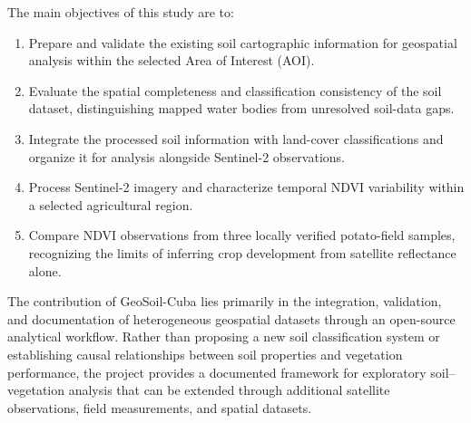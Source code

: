 The main objectives of this study are to:

\begin{enumerate}
	
	\item Prepare and validate the existing soil cartographic
	information for geospatial analysis within the selected
	Area of Interest (AOI).
	
	\item Evaluate the spatial completeness and classification
	consistency of the soil dataset, distinguishing mapped
	water bodies from unresolved soil-data gaps.
	
	\item Integrate the processed soil information with
	land-cover classifications and organize it for analysis
	alongside Sentinel-2 observations.
	
	\item Process Sentinel-2 imagery and characterize temporal
	NDVI variability within a selected agricultural region.
	
	\item Compare NDVI observations from three locally verified
	potato-field samples, recognizing the limits of inferring
	crop development from satellite reflectance alone.
	
\end{enumerate}

The contribution of GeoSoil-Cuba lies primarily in the
integration, validation, and documentation of heterogeneous
geospatial datasets through an open-source analytical workflow.
Rather than proposing a new soil classification system or
establishing causal relationships between soil properties and
vegetation performance, the project provides a documented
framework for exploratory soil--vegetation analysis that can
be extended through additional satellite observations,
field measurements, and spatial datasets.

